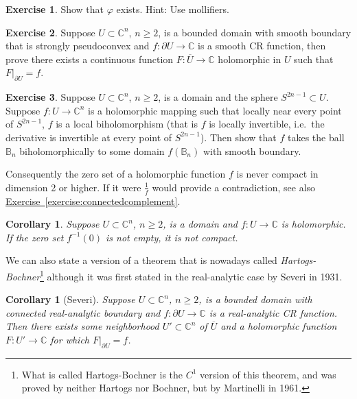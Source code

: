 \documentclass[12pt,openany]{book}
\newcommand{\C}{{\mathbb{C}}}
\newcommand{\bB}{{\mathbb{B}}}
\newcommand{\myindex}[1]{#1\index{#1}}
\theoremstyle{plain}
\newtheorem{cor}[thm]{Corollary}
\theoremstyle{remark}
\theoremstyle{definition}
\newenvironment{exbox}{%
    \def\FrameCommand{\vrule width 1pt \relax\hspace {10pt}}%
    \MakeFramed {\advance \hsize -\width \FrameRestore }%
}{%
    \endMakeFramed
}
\theoremstyle{exercise}
\newtheorem{exercise}{Exercise}[section]
\theoremstyle{example}
\newcommand{\exerciseref}[1]{\hyperref[#1]{Exercise~\ref*{#1}}}
\begin{document}
\begin{exbox}
\begin{exercise}
Show that $\varphi$ exists.  Hint: Use mollifiers.
\end{exercise}

\begin{exercise}
Suppose $U \subset \C^n$, $n \geq 2$, is a bounded domain with smooth boundary that is
strongly pseudoconvex
and $f \colon \partial U \to \C$ is a smooth CR function, then prove
there exists a continuous function $F \colon \overline{U} \to \C$
holomorphic in $U$
such that $F|_{\partial U} = f$.
\end{exercise}

\begin{exercise}
Suppose $U \subset \C^n$, $n \geq 2$, is a domain and the sphere $S^{2n-1}
\subset U$.  Suppose $f \colon U \to \C^n$ is a holomorphic mapping
such that locally near every point of $S^{2n-1}$, $f$ is a local
biholomorphism (that is $f$ is locally invertible, i.e.\ the 
derivative is invertible at every point of $S^{2n-1}$).  Then show that
$f$ takes the ball $\bB_n$ biholomorphically to some domain $f(\bB_n)$ with smooth
boundary.
\end{exercise}
\end{exbox}

Consequently the zero set of a holomorphic function $f$ is never compact in
dimension 2 or higher.  If it
were $\frac{1}{f}$ would provide a contradiction, see also
\exerciseref{exercise:connectedcomplement}.

\begin{cor}
Suppose $U \subset \C^n$, $n \geq 2$, is a domain and $f \colon U \to \C$ is
holomorphic.  If the zero set $f^{-1}(0)$ is not empty, it is not compact.
\end{cor}

We can also state a version of a theorem that is nowadays called
\emph{\myindex{Hartogs-Bochner}}\footnote{What is called
Hartogs-Bochner is 
the $C^1$ version of this theorem, and was proved by neither Hartogs nor
Bochner, but by Martinelli in 1961.}
although it was first stated
in the real-analytic case by
Severi in 1931.

\begin{cor}[Severi]
Suppose $U \subset \C^n$, $n \geq 2$, is a bounded domain with connected real-analytic boundary and
$f \colon \partial U \to \C$ is a real-analytic CR function.  Then
there exists some neighborhood $U' \subset \C^n$ of $\overline{U}$
and a holomorphic function $F \colon U' \to \C$ for which
$F|_{\partial U} = f$.
\end{cor}
\end{document}
